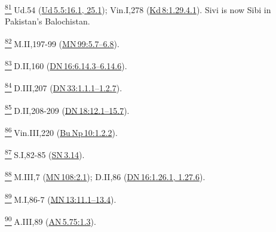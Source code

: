 \label{footprints_split_024.html_fn81}
\hyperref[footprints_split_006.htmlux5cux23fnref81]{\textsuperscript{81}} Ud.54
(\href{https://suttacentral.net/ud5.5/en/sujato\#16.1}{Ud\,5.5:16.1,
25.1}); Vin.I,278
(\href{https://suttacentral.net/pli-tv-kd8/en/brahmali?\#1.29.4.1}{Kd\,8:1.29.4.1}).
Sivi is now Sibi in Pakistan's Balochistan.

\label{footprints_split_024.html_fn82}
\hyperref[footprints_split_006.htmlux5cux23fnref82]{\textsuperscript{82}} M.II,197-99
(\href{https://suttacentral.net/mn99/en/sujato\#5.7}{MN\,99:5.7--6.8}).

\label{footprints_split_024.html_fn83}
\hyperref[footprints_split_006.htmlux5cux23fnref83]{\textsuperscript{83}} D.II,160
(\href{https://suttacentral.net/dn16/en/sujato\#6.14.3}{DN\,16:6.14.3--6.14.6}).

\label{footprints_split_024.html_fn84}
\hyperref[footprints_split_006.htmlux5cux23fnref84]{\textsuperscript{84}} D.III,207
(\href{https://suttacentral.net/dn33/en/sujato\#1.1.1}{DN\,33:1.1.1--1.2.7}).

\label{footprints_split_024.html_fn85}
\hyperref[footprints_split_006.htmlux5cux23fnref85]{\textsuperscript{85}} D.II,208-209
(\href{https://suttacentral.net/dn18/en/sujato\#12.1}{DN\,18:12.1--15.7}).

\label{footprints_split_024.html_fn86}
\hyperref[footprints_split_006.htmlux5cux23fnref86]{\textsuperscript{86}} Vin.III,220
(\href{https://suttacentral.net/pli-tv-bu-vb-np10/en/brahmali\#1.2.2}{Bu\,Np\,10:1.2.2}).

\label{footprints_split_024.html_fn87}
\hyperref[footprints_split_006.htmlux5cux23fnref87]{\textsuperscript{87}} S.I,82-85
(\href{https://suttacentral.net/sn3.14/en/sujato}{SN\,3.14}).

\label{footprints_split_024.html_fn88}
\hyperref[footprints_split_006.htmlux5cux23fnref88]{\textsuperscript{88}} M.III,7
(\href{https://suttacentral.net/mn108/en/sujato\#2.1}{MN\,108:2.1});
D.II,86
(\href{https://suttacentral.net/dn16/en/sujato\#1.26.1}{DN\,16:1.26.1,
1.27.6}).

\label{footprints_split_024.html_fn89}
\hyperref[footprints_split_006.htmlux5cux23fnref89]{\textsuperscript{89}} M.I,86-7
(\href{https://suttacentral.net/mn13/en/sujato\#11.1}{MN\,13:11.1--13.4}).

\label{footprints_split_024.html_fn90}
\hyperref[footprints_split_006.htmlux5cux23fnref90]{\textsuperscript{90}} A.III,89
(\href{https://suttacentral.net/an5.75/en/sujato\#1.3}{AN\,5.75:1.3}).

